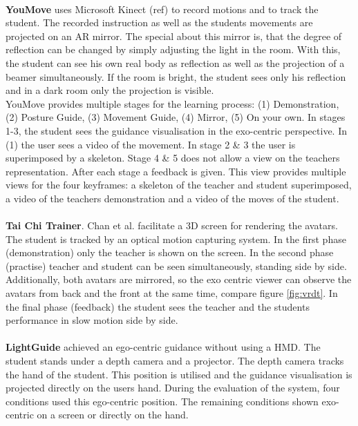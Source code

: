 $ $\\
\textbf{YouMove} uses Microsoft Kinect (\todo ref) to record motions and to track the student. The recorded instruction as well as the students movements are projected on an AR mirror. The special about this mirror is, that the degree of reflection can be changed by simply adjusting the light in the room. With this, the student can see his own real body as reflection as well as the projection of a beamer simultaneously. If the room is bright, the student sees only his reflection and in a dark room only the projection is visible.\\ 
YouMove provides multiple stages for the learning process: (1) Demonstration, (2) Posture Guide, (3) Movement Guide, (4) Mirror, (5) On your own. In stages 1-3, the student sees the guidance visualisation in the exo-centric perspective. In (1) the user sees a video of the movement. In stage 2 \& 3 the user is superimposed by a skeleton. Stage 4 \& 5 does not allow a view on the teachers representation. After each stage a feedback is given. This view provides multiple views for the four keyframes: a skeleton of the teacher and student superimposed, a video of the teachers demonstration and a video of the moves of the student.\\ \\
\textbf{Tai Chi Trainer}. Chan et al. \cite{Chan2011} facilitate a 3D screen for rendering the avatars. The student is tracked by an optical motion capturing system. In the first phase (demonstration) only the teacher is shown on the screen. In the second phase (practise) teacher and student can be seen simultaneously, standing side by side. Additionally, both avatars are mirrored, so the exo centric viewer can observe the avatars from back and the front at the same time, compare figure \ref{fig:vrdt}. In the final phase (feedback) the student sees the teacher and the students performance in slow motion side by side.\\ \\
\textbf{LightGuide} \cite{Sodhi2012} achieved an ego-centric guidance without using a HMD. The student stands under a depth camera and a projector. The depth camera tracks the hand of the student. This position is utilised and the guidance visualisation is projected directly on the users hand. During the evaluation of the system, four conditions used this ego-centric position. The remaining conditions shown exo-centric on a screen or directly on the hand.\\ \\
